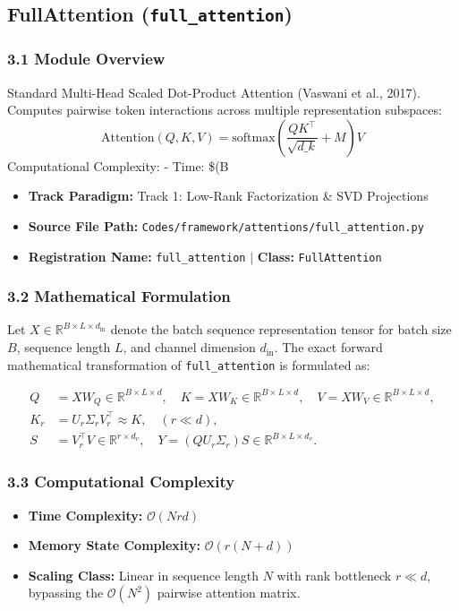 \subsection{FullAttention (\texttt{full\_attention})}
\label{sec:app_module_full_attention}

\subsubsection*{3.1 Module Overview}
Standard Multi-Head Scaled Dot-Product Attention (Vaswani et al., 2017).  Computes pairwise token interactions across multiple representation subspaces: $$\text{Attention}(Q, K, V) = \text{softmax}\left(\frac{Q K^\top}{\sqrt{d\_k}} + M\right) V$$  Computational Complexity:     - Time: \$(B 
\begin{itemize}
    \item \textbf{Track Paradigm:} Track 1: Low-Rank Factorization & SVD Projections
    \item \textbf{Source File Path:} \texttt{Codes/framework/attentions/full\_attention.py}
    \item \textbf{Registration Name:} \texttt{full\_attention} $\mid$ \textbf{Class:} \texttt{FullAttention}
\end{itemize}

\subsubsection*{3.2 Mathematical Formulation}
Let $X \in \mathbb{R}^{B \times L \times d_{\text{in}}}$ denote the batch sequence representation tensor for batch size $B$, sequence length $L$, and channel dimension $d_{\text{in}}$. The exact forward mathematical transformation of \texttt{full\_attention} is formulated as:

\begin{align}
Q &= X W_Q \in \mathbb{R}^{B \times L \times d}, \quad K = X W_K \in \mathbb{R}^{B \times L \times d}, \quad V = X W_V \in \mathbb{R}^{B \times L \times d}, \\
K_r &= U_r \Sigma_r V_r^\top \approx K, \quad (r \ll d), \\
S &= V_r^\top V \in \mathbb{R}^{r \times d_v}, \quad Y = (Q U_r \Sigma_r) S \in \mathbb{R}^{B \times L \times d_v}.
\end{align}


\subsubsection*{3.3 Computational Complexity}
\begin{itemize}
    \item \textbf{Time Complexity:} $\mathcal{O}(N r d)$
    \item \textbf{Memory State Complexity:} $\mathcal{O}(r(N + d))$
    \item \textbf{Scaling Class:} Linear in sequence length $N$ with rank bottleneck $r \ll d$, bypassing the $\mathcal{O}(N^2)$ pairwise attention matrix.
\end{itemize}

